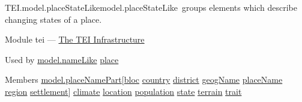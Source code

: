 \begin{reflist}
\item[]\begin{specHead}{TEI.model.placeStateLike}{model.placeStateLike} groups elements which describe changing states of a place.\end{specHead} 
    \item[{Module}]
  tei — \hyperref[ST]{The TEI Infrastructure}
    \item[{Used by}]
  \hyperref[TEI.model.nameLike]{model.nameLike} \hyperref[TEI.place]{place}
    \item[{Members}]
  \hyperref[TEI.model.placeNamePart]{model.placeNamePart}[\hyperref[TEI.bloc]{bloc} \hyperref[TEI.country]{country} \hyperref[TEI.district]{district} \hyperref[TEI.geogName]{geogName} \hyperref[TEI.placeName]{placeName} \hyperref[TEI.region]{region} \hyperref[TEI.settlement]{settlement}] \hyperref[TEI.climate]{climate} \hyperref[TEI.location]{location} \hyperref[TEI.population]{population} \hyperref[TEI.state]{state} \hyperref[TEI.terrain]{terrain} \hyperref[TEI.trait]{trait}
\end{reflist}  
